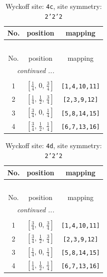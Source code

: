 \documentclass[fleqn,8pt]{jsarticle}
\begin{document}
\renewcommand{\arraystretch}{1.2}
\begin{longtable}{ccc}
\caption{Wyckoff site: {\tt 4c}, site symmetry: {\tt 2'2'2}}
 \\
 \hline \hline
No. & position & mapping \\ \hline \endfirsthead

\multicolumn{2}{l}{\tablename\ \thetable{}} \\
 \hline \hline
No. & position & mapping \\ \hline \endhead

 \hline \hline
\multicolumn{2}{r}{\footnotesize\it continued ...} \\ \endfoot

 \hline \hline
\multicolumn{2}{r}{} \\ \endlastfoot

1 & $\left[ \frac{1}{4},\, 0,\, \frac{3}{4} \right]$ & {\tt [1,4,10,11]} \\ \hline
2 & $\left[ \frac{1}{4},\, \frac{1}{2},\, \frac{3}{4} \right]$ & {\tt [2,3,9,12]} \\ \hline
3 & $\left[ \frac{3}{4},\, 0,\, \frac{1}{4} \right]$ & {\tt [5,8,14,15]} \\ \hline
4 & $\left[ \frac{3}{4},\, \frac{1}{2},\, \frac{1}{4} \right]$ & {\tt [6,7,13,16]} \\
\end{longtable}
\renewcommand{\arraystretch}{1.2}
\begin{longtable}{ccc}
\caption{Wyckoff site: {\tt 4d}, site symmetry: {\tt 2'2'2}}
 \\
 \hline \hline
No. & position & mapping \\ \hline \endfirsthead

\multicolumn{2}{l}{\tablename\ \thetable{}} \\
 \hline \hline
No. & position & mapping \\ \hline \endhead

 \hline \hline
\multicolumn{2}{r}{\footnotesize\it continued ...} \\ \endfoot

 \hline \hline
\multicolumn{2}{r}{} \\ \endlastfoot

1 & $\left[ \frac{3}{4},\, 0,\, \frac{3}{4} \right]$ & {\tt [1,4,10,11]} \\ \hline
2 & $\left[ \frac{3}{4},\, \frac{1}{2},\, \frac{3}{4} \right]$ & {\tt [2,3,9,12]} \\ \hline
3 & $\left[ \frac{1}{4},\, 0,\, \frac{1}{4} \right]$ & {\tt [5,8,14,15]} \\ \hline
4 & $\left[ \frac{1}{4},\, \frac{1}{2},\, \frac{1}{4} \right]$ & {\tt [6,7,13,16]} \\
\end{longtable}
\end{document}
